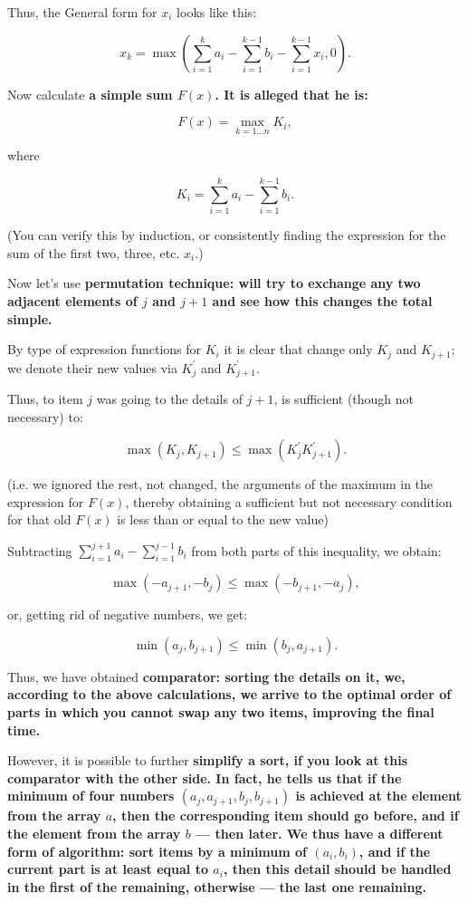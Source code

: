 Thus, the General form for $x_i$ looks like this:

$$ x_k = \max \left( \sum_{i=1}^{k} a_i - \sum_{i=1}^{k-1} b_i - \sum_{i=1}^{k-1} x_i, 0 \right). $$

Now calculate \bf{a simple sum} $F(x)$. It is alleged that he is:

$$ F(x) = \max_{k=1 \ldots n} K_i, $$

where

$$ K_i = \sum_{i=1}^{k} a_i - \sum_{i=1}^{k-1} b_i. $$

(You can verify this by induction, or consistently finding the expression for the sum of the first two, three, etc. $x_i$.)

Now let's use \bf{permutation technique}: will try to exchange any two adjacent elements of $j$ and $j+1$ and see how this changes the total simple.

By type of expression functions for $K_i$ it is clear that change only $K_j$ and $K_{j+1}$; we denote their new values via $K_j^\prime$ and $K_{j+1}^\prime$.

Thus, to item $j$ was going to the details of $j+1$, is sufficient (though not necessary) to:

$$ \max \left( K_j, K_{j+1} \right) \le \max \left( K_j^\prime K_{j+1}^\prime \right). $$

(i.e. we ignored the rest, not changed, the arguments of the maximum in the expression for $F(x)$, thereby obtaining a sufficient but not necessary condition for that old $F(x)$ is less than or equal to the new value)

Subtracting $ \sum_{i=1}^{j+1} a_i - \sum_{i=1}^{j-1} b_i $ from both parts of this inequality, we obtain:

$$ \max (-a_{j+1}, -b_j) \le \max (-b_{j+1}, -a_j), $$

or, getting rid of negative numbers, we get:

$$ \min (a_j, b_{j+1}) \le \min (b_j, a_{j+1}). $$

Thus, we have obtained \bf{comparator}: sorting the details on it, we, according to the above calculations, we arrive to the optimal order of parts in which you cannot swap any two items, improving the final time.

However, it is possible to further \bf{simplify} a sort, if you look at this comparator with the other side. In fact, he tells us that if the minimum of four numbers $(a_j, a_{j+1}, b_{j}, b_{j+1})$ is achieved at the element from the array $a$, then the corresponding item should go before, and if the element from the array $b$ --- then later. We thus have a different form of algorithm: sort items by a minimum of $(a_i, b_i)$, and if the current part is at least equal to $a_i$, then this detail should be handled in the first of the remaining, otherwise --- the last one remaining.

